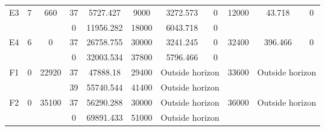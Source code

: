 \begin{table}
\begin{tabular}{c||c|c||c|c|c|c|c||c|c|c}
         &
        
      \\
      \hline
      \multirow{2}{*}{E3} &
      \multirow{2}{*}{7} &
      \multirow{2}{*}{660} &
      37 &
      5727.427 &
      9000 &
        3272.573 &
        0 &
      \multirow{2}{*}{12000} &
        \multirow{2}{*}{43.718} &
        \multirow{2}{*}{0}
      \\
      \cline{4-8}
       &
       &
       &
      0 &
      11956.282 &
      18000 &
        6043.718 &
        0 &
      
         &
        
      \\
      \hline
      \multirow{2}{*}{E4} &
      \multirow{2}{*}{6} &
      \multirow{2}{*}{0} &
      37 &
      26758.755 &
      30000 &
        3241.245 &
        0 &
      \multirow{2}{*}{32400} &
        \multirow{2}{*}{396.466} &
        \multirow{2}{*}{0}
      \\
      \cline{4-8}
       &
       &
       &
      0 &
      32003.534 &
      37800 &
        5796.466 &
        0 &
      
         &
        
      \\
      \hline
      \multirow{2}{*}{F1} &
      \multirow{2}{*}{0} &
      \multirow{2}{*}{22920} &
      37 &
      47888.18 &
      29400 &
        \multicolumn{2}{|c||}{Outside horizon} &
      \multirow{2}{*}{33600} &
        \multicolumn{2}{c}{\multirow{2}{*}{Outside horizon}}
      \\
      \cline{4-8}
       &
       &
       &
      39 &
      55740.544 &
      41400 &
        \multicolumn{2}{|c||}{Outside horizon} &
      
        
      \\
      \hline
      \multirow{2}{*}{F2} &
      \multirow{2}{*}{0} &
      \multirow{2}{*}{35100} &
      37 &
      56290.288 &
      30000 &
        \multicolumn{2}{|c||}{Outside horizon} &
      \multirow{2}{*}{36000} &
        \multicolumn{2}{c}{\multirow{2}{*}{Outside horizon}}
      \\
      \cline{4-8}
       &
       &
       &
      0 &
      69891.433 &
      51000 &
        \multicolumn{2}{|c||}{Outside horizon} &
      
        
      \\
  \hline 
\end{tabular}
\label{table:RDS2.txt-13829.tex} 
\end{table}